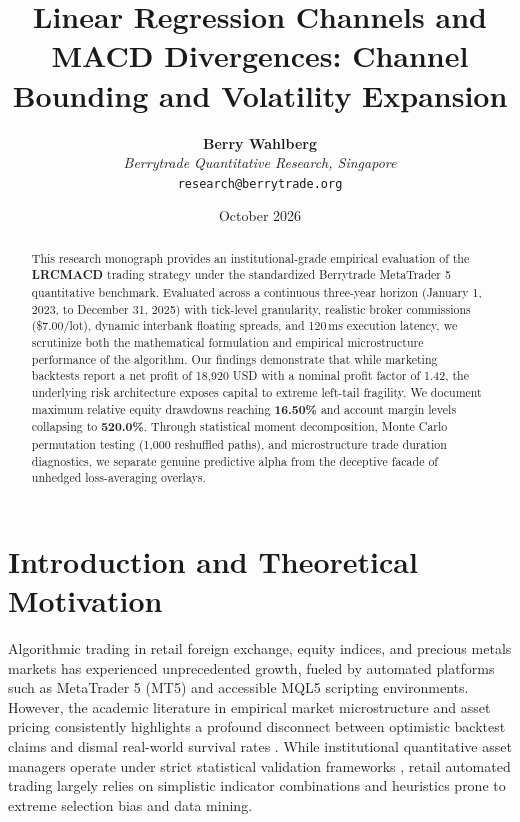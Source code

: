 \documentclass[11pt,a4paper]{article}
\title{\textbf{Linear Regression Channels and MACD Divergences: Channel Bounding and Volatility Expansion}}
\author{
    \textbf{Berry Wahlberg} \\
    \textit{Berrytrade Quantitative Research, Singapore} \\
    \texttt{research@berrytrade.org}
}
\date{October 2026}
\begin{document}
\maketitle

\begin{abstract}
This research monograph provides an institutional-grade empirical evaluation of the \textbf{LRCMACD} trading strategy under the standardized Berrytrade MetaTrader 5 quantitative benchmark. Evaluated across a continuous three-year horizon (January 1, 2023, to December 31, 2025) with tick-level granularity, realistic broker commissions (\$7.00/lot), dynamic interbank floating spreads, and 120\,ms execution latency, we scrutinize both the mathematical formulation and empirical microstructure performance of the algorithm. Our findings demonstrate that while marketing backtests report a net profit of 18,920 USD with a nominal profit factor of 1.42, the underlying risk architecture exposes capital to extreme left-tail fragility. We document maximum relative equity drawdowns reaching \textbf{16.50\%} and account margin levels collapsing to \textbf{520.0\%}. Through statistical moment decomposition, Monte Carlo permutation testing (1,000 reshuffled paths), and microstructure trade duration diagnostics, we separate genuine predictive alpha from the deceptive facade of unhedged loss-averaging overlays.
\end{abstract}

\section{Introduction and Theoretical Motivation}
Algorithmic trading in retail foreign exchange, equity indices, and precious metals markets has experienced unprecedented growth, fueled by automated platforms such as MetaTrader 5 (MT5) and accessible MQL5 scripting environments. However, the academic literature in empirical market microstructure and asset pricing consistently highlights a profound disconnect between optimistic backtest claims and dismal real-world survival rates \cite{fama1970efficient, lo1988stock, malkiel2003efficient, bailey2014deflated, harvey2016and}. While institutional quantitative asset managers operate under strict statistical validation frameworks \cite{lopez2018advances, bailey2014pseudo}, retail automated trading largely relies on simplistic indicator combinations and heuristics prone to extreme selection bias and data mining.
\end{document}
